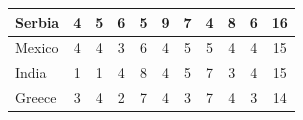 \documentclass[12pt]{article}  %
\begin{document}
\begin{subappendices}
\begin{longtable}{|l|c|c|c|c|c|c|c|c|c|c|}
	\hline
	Serbia                                                         & 4                                                                      & 5                                                                      & 6                                                                      & 5                                                                      & 9                                                                      & 7                                                                      & 4                         & 8                           & 6                           & 16                          \\ 
	\hline
	Mexico                                                         & 4                                                                      & 4                                                                      & 3                                                                      & 6                                                                      & 4                                                                      & 5                                                                      & 5                         & 4                           & 4                           & 15                          \\ 
	\hline
	India                                                          & 1                                                                      & 1                                                                      & 4                                                                      & 8                                                                      & 4                                                                      & 5                                                                      & 7                         & 3                           & 4                           & 15                          \\ 
	\hline
	Greece                                                         & 3                                                                      & 4                                                                      & 2                                                                      & 7                                                                      & 4                                                                      & 3                                                                      & 7                         & 4                           & 3                           & 14                          \\ 

\end{longtable}
\end{subappendices}
\end{document}
